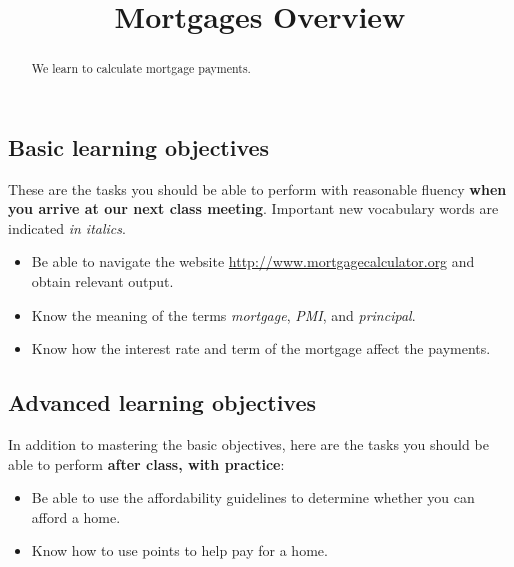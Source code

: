 \documentclass{ximera}
\title{Mortgages Overview}
\begin{document}
\begin{abstract}
We learn to calculate mortgage payments.
\end{abstract}
\maketitle

\subsection*{Basic learning objectives}

These are the tasks you should be able to perform with reasonable fluency \textbf{when you arrive at our next class meeting}. Important new vocabulary words are indicated \emph{in italics}. 

\begin{itemize}
	\item Be able to navigate the website \href{http://www.mortgagecalculator.org}{http://www.mortgagecalculator.org} and obtain relevant output.
    \item Know the meaning of the terms \emph{mortgage}, \emph{PMI}, and \emph{principal}. 
    \item Know how the interest rate and term of the mortgage affect the payments.
\end{itemize}

\subsection*{Advanced learning objectives}

In addition to mastering the basic objectives, here are the tasks you should be able to perform \textbf{after class, with practice}: 

\begin{itemize}
	\item Be able to use the affordability guidelines to determine whether you can afford a home.
    \item Know how to use points to help pay for a home.
\end{itemize}
\end{document}
